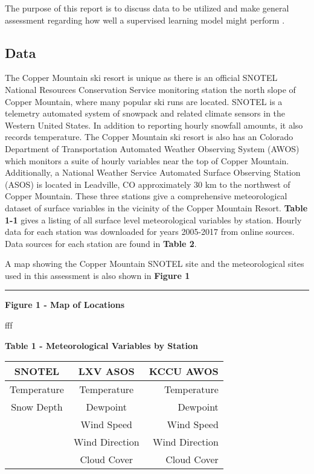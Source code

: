 \documentclass[11pt]{article}
\begin{document}
The purpose of this report is to discuss data to be utilized and make
general assessment regarding how well a supervised learning model might
perform .

\subsection{Data}\label{data}

The Copper Mountain ski resort is unique as there is an official SNOTEL
National Resources Conservation Service monitoring station the north
slope of Copper Mountain, where many popular ski runs are located.
SNOTEL is a telemetry automated system of snowpack and related climate
sensors in the Western United States. In addition to reporting hourly
snowfall amounts, it also records temperature. The Copper Mountain ski
resort is also has an Colorado Department of Transportation Automated
Weather Observing System (AWOS) which monitors a suite of hourly
variables near the top of Copper Mountain. Additionally, a National
Weather Service Automated Surface Observing Station (ASOS) is located in
Leadville, CO approximately 30 km to the northwest of Copper Mountain.
These three stations give a comprehensive meteorological dataset of
surface variables in the vicinity of the Copper Mountain Resort.
\textbf{Table 1-1} gives a listing of all surface level meteorological
variables by station. Hourly data for each station was downloaded for
years 2005-2017 from online sources. Data sources for each station are
found in \textbf{Table 2}.

A map showing the Copper Mountain SNOTEL site and the meteorological
sites used in this assessment is also shown in \textbf{Figure 1}

\begin{center}\rule{0.5\linewidth}{\linethickness}\end{center}

\textbf{Figure 1 - Map of Locations}

fff

\textbf{Table 1 - Meteorological Variables by Station}

\begin{longtable}[]{@{}ccr@{}}
\toprule
SNOTEL & LXV ASOS & KCCU AWOS\tabularnewline
\midrule
\endhead
Temperature & Temperature & Temperature\tabularnewline
Snow Depth & Dewpoint & Dewpoint\tabularnewline
& Wind Speed & Wind Speed\tabularnewline
& Wind Direction & Wind Direction\tabularnewline
& Cloud Cover & Cloud Cover\tabularnewline
\bottomrule
\end{longtable}
\end{document}
